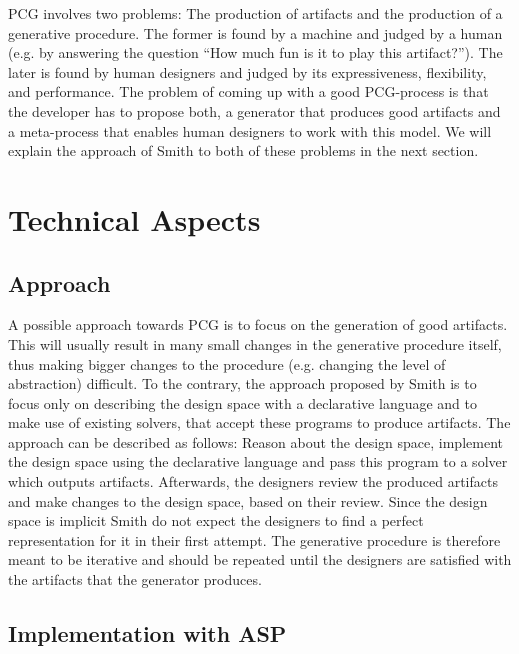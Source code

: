 \documentclass[runningheads]{llncs}
\newcommand{\authorquote}{Smith \etal}
\begin{document}
    PCG involves two problems: The production of artifacts and the production of a generative procedure. The former is found by a machine and judged by a human (e.g. by answering the question ``How much fun is it to play this artifact?''). The later is found by human designers and judged by its expressiveness, flexibility, and performance. The problem of coming up with a good PCG-process is that the developer has to propose both, a generator that produces good artifacts and a meta-process that enables human designers to work with this model. We will explain the approach of \authorquote{} to both of these problems in the next section.

\section{Technical Aspects} \label{sec:ta}

\subsection{Approach}

    A possible approach towards PCG is to focus on the generation of good artifacts. This  will usually result in many small changes in the generative procedure itself, thus making bigger changes to the procedure (e.g. changing the level of abstraction) difficult. To the contrary, the approach proposed by \authorquote{} is to focus only on describing the design space with a declarative language and to make use of existing solvers, that accept these programs to produce artifacts. The approach can be described as follows: Reason about the design space, implement the design space using the declarative language and pass this program to a solver which outputs artifacts. Afterwards, the designers review the produced artifacts and make changes to the design space, based on their review. Since the design space is implicit \authorquote{} do not expect the designers to find a perfect representation for it in their first attempt. The generative procedure is therefore meant to be iterative and should be repeated until the  designers are satisfied with the artifacts that the generator produces. 
    
    \subsection{Implementation with ASP}
    
\end{document}
